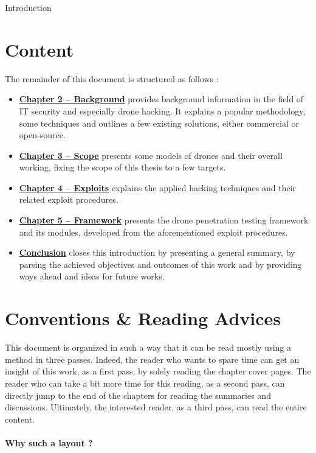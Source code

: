 \begin{chaptercover}{Introduction}
\section{Content}
The remainder of this document is structured as follows :
\begin{itemize}[itemsep=0.1cm,topsep=0.1cm]
  \item \hyperref[background]{\color{FirstBlue}\bfseries Chapter 2 -- Background} provides background information in the field of IT security and especially drone hacking. It explains a popular methodology, some techniques and outlines a few existing solutions, either commercial or open-source.
  \item \hyperref[scope]{\color{FirstBlue}\bfseries Chapter 3 -- Scope} presents some models of drones and their overall working, fixing the scope of this thesis to a few targets.
  \item \hyperref[exploits]{\color{FirstBlue}\bfseries Chapter 4 -- Exploits} explains the applied hacking techniques and their related exploit procedures.
  \item \hyperref[framework]{\color{FirstBlue}\bfseries Chapter 5 -- Framework} presents the drone penetration testing framework and its modules, developed from the aforementioned exploit procedures.
  \item \hyperref[conclusion]{\color{FirstBlue}\bfseries Conclusion} closes this introduction by presenting a general summary, by parsing the achieved objectives and outcomes of this work and by providing ways ahead and ideas for future works.
\end{itemize}


\section{Conventions \& Reading Advices}
This document is organized in such a way that it can be read mostly using a method in three passes. Indeed, the reader who wants to spare time can get an insight of this work, as a first pass, by solely reading the chapter cover pages. The reader who can take a bit more time for this reading, as a second pass, can directly jump to the end of the chapters for reading the summaries and discussions. Ultimately, the interested reader, as a third pass, can read the entire content.

\begin{tip}
\vspace{-.5cm}
\paragraph{Why such a layout ?}\hfill


\end{tip}
\end{chaptercover}
